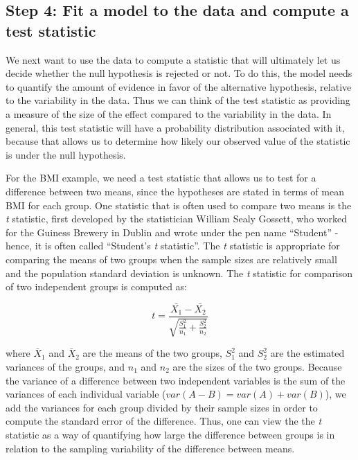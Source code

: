 \documentclass[
  12pt,
]{book}
\begin{document}
\hypertarget{step-4-fit-a-model-to-the-data-and-compute-a-test-statistic}{%
\subsection{Step 4: Fit a model to the data and compute a test statistic}\label{step-4-fit-a-model-to-the-data-and-compute-a-test-statistic}}

We next want to use the data to compute a statistic that will ultimately let us decide whether the null hypothesis is rejected or not. To do this, the model needs to quantify the amount of evidence in favor of the alternative hypothesis, relative to the variability in the data. Thus we can think of the test statistic as providing a measure of the size of the effect compared to the variability in the data. In general, this test statistic will have a probability distribution associated with it, because that allows us to determine how likely our observed value of the statistic is under the null hypothesis.

For the BMI example, we need a test statistic that allows us to test for a difference between two means, since the hypotheses are stated in terms of mean BMI for each group. One statistic that is often used to compare two means is the \emph{t} statistic, first developed by the statistician William Sealy Gossett, who worked for the Guiness Brewery in Dublin and wrote under the pen name ``Student'' - hence, it is often called ``Student's \emph{t} statistic''. The \emph{t} statistic is appropriate for comparing the means of two groups when the sample sizes are relatively small and the population standard deviation is unknown. The \emph{t} statistic for comparison of two independent groups is computed as:

\[
t = \frac{\bar{X_1} - \bar{X_2}}{\sqrt{\frac{S_1^2}{n_1} + \frac{S_2^2}{n_2}}}
\]

where \(\bar{X}_1\) and \(\bar{X}_2\) are the means of the two groups, \(S^2_1\) and \(S^2_2\) are the estimated variances of the groups, and \(n_1\) and \(n_2\) are the sizes of the two groups. Because the variance of a difference between two independent variables is the sum of the variances of each individual variable (\(var(A - B) = var(A) + var(B)\)), we add the variances for each group divided by their sample sizes in order to compute the standard error of the difference. Thus, one can view the the \emph{t} statistic as a way of quantifying how large the difference between groups is in relation to the sampling variability of the difference between means.
\end{document}

